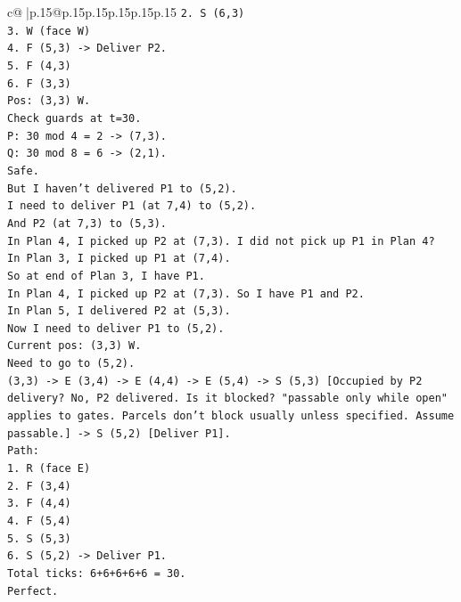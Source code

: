 \documentclass{article}
\begin{document}
{\begin{supertabular}{c@{$\;$}|p{.15\linewidth}@{}p{.15\linewidth}p{.15\linewidth}p{.15\linewidth}p{.15\linewidth}p{.15\linewidth}}
{{{\texttt{2. S (6,3)} \\
\texttt{3. W (face W)} \\
\texttt{4. F (5,3) {-}> Deliver P2.} \\
\texttt{5. F (4,3)} \\
\texttt{6. F (3,3)} \\
\texttt{Pos: (3,3) W.} \\
\texttt{Check guards at t=30.} \\
\texttt{P: 30 mod 4 = 2 {-}> (7,3).} \\
\texttt{Q: 30 mod 8 = 6 {-}> (2,1).} \\
\texttt{Safe.} \\
\texttt{But I haven't delivered P1 to (5,2).} \\
\texttt{I need to deliver P1 (at 7,4) to (5,2).} \\
\texttt{And P2 (at 7,3) to (5,3).} \\
\texttt{In Plan 4, I picked up P2 at (7,3). I did not pick up P1 in Plan 4?} \\
\texttt{In Plan 3, I picked up P1 at (7,4).} \\
\texttt{So at end of Plan 3, I have P1.} \\
\texttt{In Plan 4, I picked up P2 at (7,3). So I have P1 and P2.} \\
\texttt{In Plan 5, I delivered P2 at (5,3).} \\
\texttt{Now I need to deliver P1 to (5,2).} \\
\texttt{Current pos: (3,3) W.} \\
\texttt{Need to go to (5,2).} \\
\texttt{(3,3) {-}> E (3,4) {-}> E (4,4) {-}> E (5,4) {-}> S (5,3) {[}Occupied by P2 delivery? No, P2 delivered. Is it blocked? "passable only while open" applies to gates. Parcels don't block usually unless specified. Assume passable.{]} {-}> S (5,2) {[}Deliver P1{]}.} \\
\texttt{Path:} \\
\texttt{1. R (face E)} \\
\texttt{2. F (3,4)} \\
\texttt{3. F (4,4)} \\
\texttt{4. F (5,4)} \\
\texttt{5. S (5,3)} \\
\texttt{6. S (5,2) {-}> Deliver P1.} \\
\texttt{Total ticks: 6+6+6+6+6 = 30.} \\
\texttt{Perfect.} \\
\\ 
}}}
\end{supertabular}}
\end{document}
